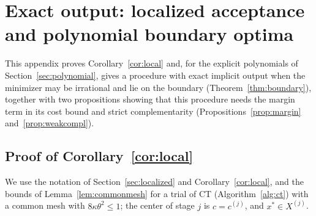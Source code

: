 \section{Exact output: localized acceptance and polynomial boundary optima}\label{app:exact}

This appendix proves Corollary~\ref{cor:local} and, for the explicit
polynomials of Section~\ref{sec:polynomial}, gives a procedure with exact
implicit output when the minimizer may be irrational and lie on the boundary
(Theorem~\ref{thm:boundary}), together with two propositions showing that
this procedure needs the margin term in its cost bound and strict
complementarity (Propositions~\ref{prop:margin} and~\ref{prop:weakcompl}).

\subsection{Proof of Corollary~\ref{cor:local}}\label{app:localized}
We use the notation of Section~\ref{sec:localized} and
Corollary~\ref{cor:local}, and the bounds of Lemma~\ref{lem:commonmesh} for a
trial of CT (Algorithm~\ref{alg:ct}) with a common mesh with
$8\kappa\theta^2\le1$; the center of stage $j$ is $c=c^{(j)}$, and
$x^*\in X^{(j)}$.

